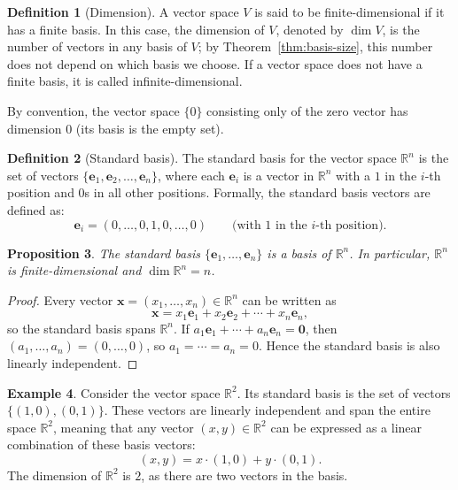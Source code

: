 \documentclass[11pt]{article}
\theoremstyle{definition}
\newtheorem{definition}{Definition}[section]
\newtheorem{example}[definition]{Example}
\theoremstyle{plain}
\newtheorem{proposition}[definition]{Proposition}
\theoremstyle{remark}
\begin{document}
\begin{definition}[Dimension]
    A vector space $V$ is said to be finite-dimensional if it has a finite basis. In this case, the dimension of $V$, denoted by $\dim V$, is the number of vectors in any basis of $V$; by Theorem~\ref{thm:basis-size}, this number does not depend on which basis we choose. If a vector space does not have a finite basis, it is called infinite-dimensional.

    By convention, the vector space $\{0\}$ consisting only of the zero vector has dimension $0$ (its basis is the empty set).
\end{definition}

\begin{definition}[Standard basis]
    The standard basis for the vector space $\mathbb{R}^n$ is the set of vectors $\{\mathbf{e}_1, \mathbf{e}_2, \ldots, \mathbf{e}_n\}$, where each $\mathbf{e}_i$ is a vector in $\mathbb{R}^n$ with a $1$ in the $i$-th position and $0$s in all other positions. Formally, the standard basis vectors are defined as:
    \[\mathbf{e}_i = (0, \ldots, 0, 1, 0, \ldots, 0) \qquad \text{(with $1$ in the $i$-th position)}.\]
\end{definition}

\begin{proposition}
    The standard basis $\{\mathbf{e}_1, \ldots, \mathbf{e}_n\}$ is a basis of $\mathbb{R}^n$. In particular, $\mathbb{R}^n$ is finite-dimensional and $\dim \mathbb{R}^n = n$.
\end{proposition}

\begin{proof}
    Every vector $\mathbf{x} = (x_1, \ldots, x_n) \in \mathbb{R}^n$ can be written as
    \[\mathbf{x} = x_1 \mathbf{e}_1 + x_2 \mathbf{e}_2 + \cdots + x_n \mathbf{e}_n,\]
    so the standard basis spans $\mathbb{R}^n$. If $a_1 \mathbf{e}_1 + \cdots + a_n \mathbf{e}_n = \mathbf{0}$, then $(a_1, \ldots, a_n) = (0, \ldots, 0)$, so $a_1 = \cdots = a_n = 0$. Hence the standard basis is also linearly independent.
\end{proof}

\begin{example}
    Consider the vector space $\mathbb{R}^2$. Its standard basis is the set of vectors $\{(1, 0), (0, 1)\}$. These vectors are linearly independent and span the entire space $\mathbb{R}^2$, meaning that any vector $(x, y) \in \mathbb{R}^2$ can be expressed as a linear combination of these basis vectors:
    \[(x, y) = x \cdot (1, 0) + y \cdot (0, 1).\]
    The dimension of $\mathbb{R}^2$ is $2$, as there are two vectors in the basis.
\end{example}
\end{document}
